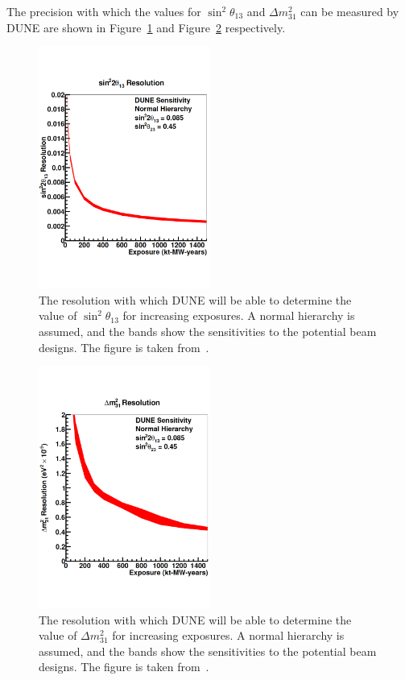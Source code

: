 The precision with which the values for $\sin^{2}\theta_{13}$ and $\Delta m^{2}_{31}$ can be measured by DUNE are shown in Figure~\ref{fig:DUNETheta13Res} and Figure~\ref{fig:DUNEDeltaMRes} respectively. \\ 

\begin{figure}
  \centering
  \includegraphics[width=0.5\textwidth]{DUNETheta13Res}
  \caption[The resolution with which DUNE will be able to determine the value of $\sin^{2}\theta_{13}$ for increasing exposures]
          {The resolution with which DUNE will be able to determine the value of $\sin^{2}\theta_{13}$ for increasing exposures. A normal hierarchy is assumed, and the bands show the sensitivities to the potential beam designs. The figure is taken from~\citep{DUNECDR_V2}.}
  \label{fig:DUNETheta13Res}
\end{figure}

\begin{figure}
  \centering
  \includegraphics[width=0.5\textwidth]{DUNEDeltaMRes}
  \caption[The resolution with which DUNE will be able to determine the value of $\Delta m^{2}_{31}$ for increasing exposures]
          {The resolution with which DUNE will be able to determine the value of $\Delta m^{2}_{31}$ for increasing exposures. A normal hierarchy is assumed, and the bands show the sensitivities to the potential beam designs. The figure is taken from~\citep{DUNECDR_V2}.}
  \label{fig:DUNEDeltaMRes}
\end{figure}


